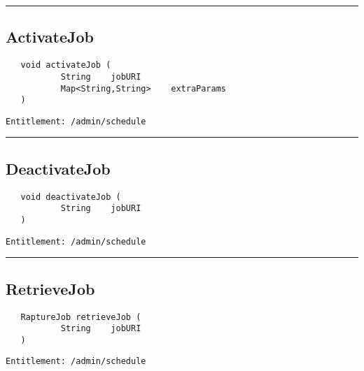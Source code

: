\rule{12cm}{2pt}
\subsection{ActivateJob}
\label{Api:ActivateJob}
\begin{verbatim}
   void activateJob (
           String    jobURI
           Map<String,String>    extraParams
   )
\end{verbatim}
\begin{Verbatim}[fontsize=\small, formatcom=\color{Maroon}]
  Entitlement: /admin/schedule
\end{Verbatim}



\rule{12cm}{2pt}
\subsection{DeactivateJob}
\label{Api:DeactivateJob}
\begin{verbatim}
   void deactivateJob (
           String    jobURI
   )
\end{verbatim}
\begin{Verbatim}[fontsize=\small, formatcom=\color{Maroon}]
  Entitlement: /admin/schedule
\end{Verbatim}



\rule{12cm}{2pt}
\subsection{RetrieveJob}
\label{Api:RetrieveJob}
\begin{verbatim}
   RaptureJob retrieveJob (
           String    jobURI
   )
\end{verbatim}
\begin{Verbatim}[fontsize=\small, formatcom=\color{Maroon}]
  Entitlement: /admin/schedule
\end{Verbatim}



